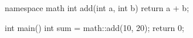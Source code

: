 \begin{exampleblock}
\begin{codeblock}[language=C++]
namespace math {
    int add(int a, int b) {
        return a + b;
    }
}

int main() {
    int sum = math::add(10, 20);
    return 0;
}
\end{codeblock}
\end{exampleblock}